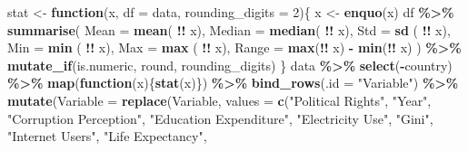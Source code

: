 \documentclass[
  english,
  man,floatsintext]{apa6}
\newenvironment{Shaded}{\begin{snugshade}}{\end{snugshade}}
\newcommand{\ControlFlowTok}[1]{\textcolor[rgb]{0.13,0.29,0.53}{\textbf{#1}}}
\newcommand{\DataTypeTok}[1]{\textcolor[rgb]{0.13,0.29,0.53}{#1}}
\newcommand{\DecValTok}[1]{\textcolor[rgb]{0.00,0.00,0.81}{#1}}
\newcommand{\KeywordTok}[1]{\textcolor[rgb]{0.13,0.29,0.53}{\textbf{#1}}}
\newcommand{\NormalTok}[1]{#1}
\newcommand{\OperatorTok}[1]{\textcolor[rgb]{0.81,0.36,0.00}{\textbf{#1}}}
\newcommand{\StringTok}[1]{\textcolor[rgb]{0.31,0.60,0.02}{#1}}
\begin{document}
\begin{Shaded}
\begin{Highlighting}[]
\NormalTok{stat \textless{}{-}}\StringTok{ }\ControlFlowTok{function}\NormalTok{(x, }\DataTypeTok{df =}\NormalTok{ data, }\DataTypeTok{rounding\_digits =} \DecValTok{2}\NormalTok{)\{}
\NormalTok{    x \textless{}{-}}\StringTok{ }\KeywordTok{enquo}\NormalTok{(x)}
\NormalTok{    df }\OperatorTok{\%\textgreater{}\%}
\StringTok{      }\KeywordTok{summarise}\NormalTok{(}
                       \DataTypeTok{Mean  =} \KeywordTok{mean}\NormalTok{( }\OperatorTok{!!}\StringTok{ }\NormalTok{x),}
                     \DataTypeTok{Median  =} \KeywordTok{median}\NormalTok{( }\OperatorTok{!!}\StringTok{ }\NormalTok{x),}
                         \DataTypeTok{Std =} \KeywordTok{sd}\NormalTok{  ( }\OperatorTok{!!}\StringTok{ }\NormalTok{x),}
                         \DataTypeTok{Min =} \KeywordTok{min}\NormalTok{ ( }\OperatorTok{!!}\StringTok{ }\NormalTok{x),}
                         \DataTypeTok{Max =} \KeywordTok{max}\NormalTok{ ( }\OperatorTok{!!}\StringTok{ }\NormalTok{x),}
                       \DataTypeTok{Range =} \KeywordTok{max}\NormalTok{(}\OperatorTok{!!}\StringTok{ }\NormalTok{x) }\OperatorTok{{-}}\StringTok{ }\KeywordTok{min}\NormalTok{(}\OperatorTok{!!}\StringTok{ }\NormalTok{x) ) }\OperatorTok{\%\textgreater{}\%}
\StringTok{      }\KeywordTok{mutate\_if}\NormalTok{(is.numeric, round, rounding\_digits)}
\NormalTok{\}}
\NormalTok{data }\OperatorTok{\%\textgreater{}\%}\StringTok{ }
\StringTok{  }\KeywordTok{select}\NormalTok{(}\OperatorTok{{-}}\NormalTok{country) }\OperatorTok{\%\textgreater{}\%}\StringTok{ }
\KeywordTok{map}\NormalTok{(}\ControlFlowTok{function}\NormalTok{(x)\{}\KeywordTok{stat}\NormalTok{(x)\}) }\OperatorTok{\%\textgreater{}\%}\StringTok{ }
\StringTok{  }\KeywordTok{bind\_rows}\NormalTok{(}\DataTypeTok{.id =} \StringTok{"Variable"}\NormalTok{) }\OperatorTok{\%\textgreater{}\%}\StringTok{ }
\StringTok{  }\KeywordTok{mutate}\NormalTok{(}\DataTypeTok{Variable =} \KeywordTok{replace}\NormalTok{(Variable, }
                            \DataTypeTok{values =} \KeywordTok{c}\NormalTok{(}\StringTok{"Political Rights"}\NormalTok{, }\StringTok{"Year"}\NormalTok{, }
                                       \StringTok{"Corruption Perception"}\NormalTok{, }
                                       \StringTok{"Education Expenditure"}\NormalTok{, }
                                       \StringTok{"Electricity Use"}\NormalTok{, }
                                       \StringTok{"Gini"}\NormalTok{, }
                                       \StringTok{"Internet Users"}\NormalTok{,}
                                       \StringTok{"Life Expectancy"}\NormalTok{, }

\end{Highlighting}
\end{Shaded}
\end{document}
